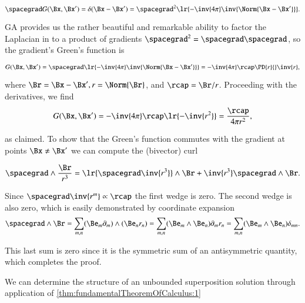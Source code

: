 \begin{equation}\label{eqn:gradientGreensFunctionEuclidean:481}
\spacegrad G(\Bx, \Bx') = \delta( \Bx - \Bx' ) = \spacegrad^2 \lr{ -\inv{4\pi} \inv{ \Norm{\Bx - \Bx'} } }.
\end{equation}

GA provides us the rather beautiful and remarkable ability to factor the Laplacian in to a product of gradients \( \spacegrad^2 = \spacegrad \spacegrad \), so the gradient's Green's function is

\begin{dmath}\label{eqn:gradientGreensFunctionEuclidean:580}
G(\Bx, \Bx')
= \spacegrad \lr{ -\inv{4\pi} \inv{ \Norm{\Bx - \Bx'} } }
= -\inv{4\pi} \rcap \PD{r}{} \inv{r},
\end{dmath}

where \( \Br = \Bx - \Bx', r = \Norm{\Br} \), and \( \rcap = \Br/r \).  Proceeding with the derivatives, we find
\begin{dmath}\label{eqn:gradientGreensFunctionEuclidean:600}
G(\Bx, \Bx')
= -\inv{4\pi} \rcap \lr{ -\inv{r^2} }
= \frac{\rcap}{4 \pi r^2},
\end{dmath}

as claimed.  To show that the Green's function commutes with the gradient at points \( \Bx \ne \Bx' \) we can compute the (bivector) curl

\begin{dmath}\label{eqn:gradientGreensFunctionEuclidean:620}
\spacegrad \wedge \frac{\Br}{r^3}
=
\lr{ \spacegrad \inv{r^3}} \wedge \Br
+
\inv{r^3} \spacegrad \wedge \Br.
\end{dmath}

Since \( \spacegrad \inv{r^m} \propto \rcap \) the first wedge is zero.  The second wedge is also zero, which is easily demonstrated by coordinate expansion
\begin{dmath}\label{eqn:gradientGreensFunctionEuclidean:640}
\spacegrad \wedge \Br
=
\sum_{m,n} (\Be_m \partial_m) \wedge (\Be_n r_n)
=
\sum_{m,n} (\Be_m \wedge \Be_n) \partial_m r_n
=
\sum_{m,n} (\Be_m \wedge \Be_n) \delta_{m n}.
\end{dmath}

This last sum is zero since it is the symmetric sum of an antisymmetric quantity, which completes the proof.

We can determine the structure of an unbounded superposition solution through application of
\cref{thm:fundamentalTheoremOfCalculus:1}

